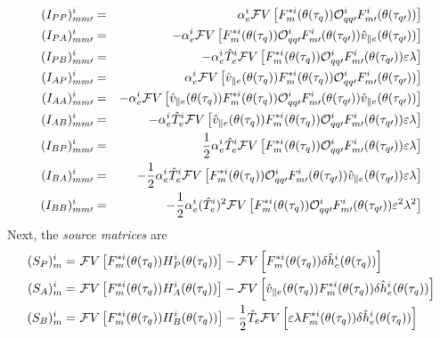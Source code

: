 \begin{eqnarray}
%
(I_{PP})_{mm\prime}^{i} & = & \alpha_{e}^{i} {\cal F} V\left[ 
F_{m}^{*i}(\theta(\tau_q)) {\cal O}_{qq\prime}^{i} 
F_{m\prime}^{i}(\theta(\tau_{q\prime})) \right] \\
%
(I_{PA})_{mm\prime}^{i} & = & -\alpha_{e}^{i} {\cal F} V\left[ 
F_{m}^{*i}(\theta(\tau_q)) {\cal O}_{qq\prime}^{i} 
F_{m\prime}^{i}(\theta(\tau_{q\prime})) 
\hat{v}_{\parallel e}(\theta(\tau_{q\prime})) \right] \\
%
(I_{PB})_{mm\prime}^{i} & = & -\alpha_{e}^{i} \hat{T}_{e}^{i} {\cal F} V\left[ 
F_{m}^{*i}(\theta(\tau_q)) {\cal O}_{qq\prime}^{i} 
F_{m\prime}^{i}(\theta(\tau_{q\prime})) \varepsilon \lambda  \right] \\
%
(I_{AP})_{mm\prime}^{i} & = & \alpha_{e}^{i} {\cal F} V\left[ 
\hat{v}_{\parallel e}(\theta(\tau_{q}))
F_{m}^{*i}(\theta(\tau_q)) {\cal O}_{qq\prime}^{i} 
F_{m\prime}^{i}(\theta(\tau_{q\prime})) \right]\\
%
(I_{AA})_{mm\prime}^{i} & = & -\alpha_{e}^{i} {\cal F} V\left[ 
\hat{v}_{\parallel e}(\theta(\tau_{q}))
F_{m}^{*i}(\theta(\tau_q)) {\cal O}_{qq\prime}^{i} 
F_{m\prime}^{i}(\theta(\tau_{q\prime})) 
\hat{v}_{\parallel e}(\theta(\tau_{q\prime}))
\right]\\
%
(I_{AB})_{mm\prime}^{i} & = & -\alpha_{e}^{i} \hat{T}_{e}^{i} {\cal F} V\left[ 
\hat{v}_{\parallel e}(\theta(\tau_q))
F_{m}^{*i}(\theta(\tau_q)) {\cal O}_{qq\prime}^{i} 
F_{m\prime}^{i}(\theta(\tau_{q\prime}))  \varepsilon \lambda \right]\\
%
(I_{BP})_{mm\prime}^{i} & = & \frac{1}{2} \alpha_{e}^{i} \hat{T}_{e}^{i}
{\cal F} V\left[ 
F_{m}^{*i}(\theta(\tau_q)) {\cal O}_{qq\prime}^{i} 
F_{m\prime}^{i}(\theta(\tau_{q\prime})) \varepsilon \lambda  \right]\\
%
(I_{BA})_{mm\prime}^{i} & = & -\frac{1}{2} \alpha_{e}^{i} \hat{T}_{e}^{i}
{\cal F} V\left[ 
F_{m}^{*i}(\theta(\tau_q)) {\cal O}_{qq\prime}^{i} 
F_{m\prime}^{i}(\theta(\tau_{q\prime})) 
\hat{v}_{\parallel e}(\theta(\tau_{q\prime}))
\varepsilon \lambda  \right]\\
%
(I_{BB})_{mm\prime}^{i} & = & -\frac{1}{2} \alpha_{e}^{i} (\hat{T}_{e}^{i})^2
{\cal F} V\left[ 
F_{m}^{*i}(\theta(\tau_q)) {\cal O}_{qq\prime}^{i} 
F_{m\prime}^{i}(\theta(\tau_{q\prime}))  \varepsilon^2 \lambda^2 \right]
\end{eqnarray}
%
Next, the \textit{source matrices} are
%
\begin{align}
(S_{P})_{m}^{i} = &~{\cal F}V\left[ F_{m}^{*i}(\theta(\tau_q)) 
H_{P}^{i}(\theta(\tau_q)) \right] - {\cal F}V\left[ F_{m}^{*i}(\theta(\tau_q)) 
\delta \hat{h}_{e}^{i}(\theta(\tau_q)) \right] 
 \label{source.p}\\
(S_{A})_{m}^{i} = &~{\cal F}V\left[ F_{m}^{*i}(\theta(\tau_q)) 
H_{A}^{i}(\theta(\tau_q)) \right]-{\cal F}V\left[ \hat{v}_{\parallel e}(\theta(\tau_q)) 
F_{m}^{*i}(\theta(\tau_q)) \delta \hat{h}_{e}^{i}(\theta(\tau_q)) \right] 
\label{source.a}\\
(S_{B})_{m}^{i} = &~{\cal F}V\left[ F_{m}^{*i}(\theta(\tau_q)) H_{B}^{i}(\theta(\tau_q)) 
\right] - \frac{1}{2} \hat{T}_{e} 
{\cal F}V\left[\varepsilon \lambda F_{m}^{*i}(\theta(\tau_q)) 
\delta \hat{h}_{e}^{i}(\theta(\tau_q)) \right]
\label{source.b}
\end{align}

